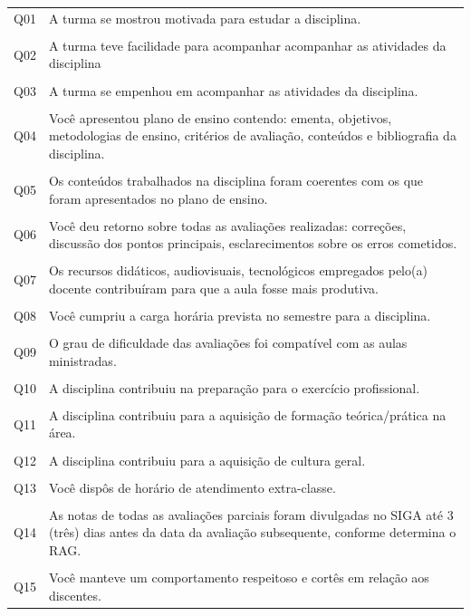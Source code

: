 \documentclass[a4paper,10pt]{article}
\begin{document}
\small{
\begin{center}
\begin{tabularx}{\linewidth}{c|X}
Q01&A turma se mostrou motivada para estudar a disciplina.\\\\
Q02&A turma teve facilidade para acompanhar acompanhar as atividades da disciplina\\\\
Q03&A turma se empenhou em acompanhar as atividades da disciplina.\\\\
Q04&Você apresentou plano de ensino contendo: ementa, objetivos, metodologias de ensino, critérios de avaliação, conteúdos e bibliografia da disciplina.\\\\
Q05&Os conteúdos trabalhados na disciplina foram coerentes com os que foram apresentados no plano de ensino.\\\\
Q06&Você deu retorno sobre todas as avaliações realizadas: correções, discussão dos pontos principais, esclarecimentos sobre os erros cometidos.\\\\
Q07&Os recursos didáticos, audiovisuais, tecnológicos empregados pelo(a) docente contribuíram para que a aula fosse mais produtiva.\\\\
Q08&Você cumpriu a carga horária prevista no semestre para a disciplina.\\\\
Q09&O grau de dificuldade das avaliações foi compatível com as aulas ministradas.\\\\
Q10&A disciplina contribuiu na preparação para o exercício profissional.\\\\
Q11&A disciplina contribuiu para a aquisição de formação teórica/prática na área. \\\\
Q12&A disciplina contribuiu para a aquisição de cultura geral.\\\\
Q13&Você dispôs de horário de atendimento extra-classe.\\\\
Q14& As notas de todas as avaliações parciais foram divulgadas no SIGA até 3 (três) dias antes da data da avaliação subsequente, conforme determina o RAG. \\\\
Q15&Você manteve um comportamento respeitoso e cortês em relação aos discentes.
\end{tabularx}
\end{center}
}
\end{document}

